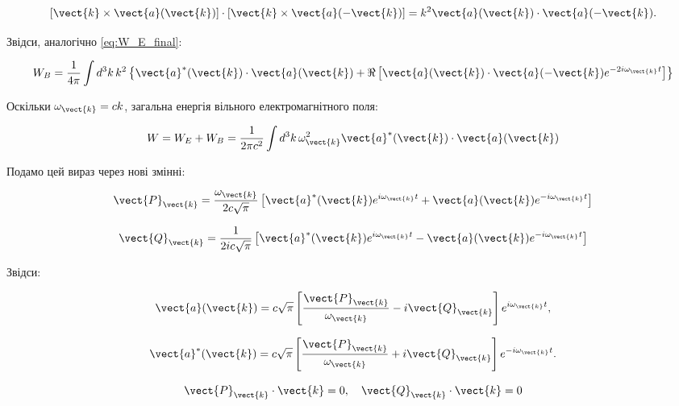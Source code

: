 \begin{equation*}
\left[ \vect{k} \times \vect{a}(\vect{k}) \right] \cdot \left[ \vect{k} \times \vect{a}(-\vect{k}) \right] = k^2 \vect{a}(\vect{k}) \cdot
\vect{a}(-\vect{k}).
\end{equation*}

Звідси, аналогічно \eqref{eq:W_E_final}:

\begin{equation}
W_B = \frac{1}{4\pi} \int d^3k \, k^2 \left\{ \vect{a}^*(\vect{k}) \cdot \vect{a}(\vect{k}) + \Re \left[ \vect{a}(\vect{k}) \cdot
\vect{a}(-\vect{k}) e^{-2i\omega_{\vect{k}} t} \right] \right\}
\label{eq:W_B_final}
\end{equation}

Оскільки \(\omega_{\vect{k}} = ck\), загальна енергія вільного електромагнітного поля:

\begin{equation}
W = W_E + W_B = \frac{1}{2\pi c^2} \int d^3k \, \omega_{\vect{k}}^2 \vect{a}^*(\vect{k}) \cdot \vect{a}(\vect{k})
\label{eq:total_energy}
\end{equation}

Подамо цей вираз через нові змінні:

\begin{equation}
\vect{P}_{\vect{k}} = \frac{\omega_{\vect{k}}}{2c\sqrt{\pi}} \left[ \vect{a}^*(\vect{k}) e^{i\omega_{\vect{k}} t} + \vect{a}(\vect{k})
e^{-i\omega_{\vect{k}} t} \right]
\label{eq:P_k}
\end{equation}

\begin{equation}
\vect{Q}_{\vect{k}} = \frac{1}{2ic\sqrt{\pi}} \left[ \vect{a}^*(\vect{k}) e^{i\omega_{\vect{k}} t} - \vect{a}(\vect{k}) e^{-i\omega_{\vect{k}} t} \right]
\label{eq:Q_k}
\end{equation}

Звідси:

\begin{equation*}
\vect{a}(\vect{k}) = c\sqrt{\pi} \left[ \frac{\vect{P}_{\vect{k}}}{\omega_{\vect{k}}} - i\vect{Q}_{\vect{k}} \right] e^{i\omega_{\vect{k}} t},
\end{equation*}

\begin{equation*}
\vect{a}^*(\vect{k}) = c\sqrt{\pi} \left[ \frac{\vect{P}_{\vect{k}}}{\omega_{\vect{k}}} + i\vect{Q}_{\vect{k}} \right] e^{-i\omega_{\vect{k}} t}.
\end{equation*}

\begin{equation*}
\vect{P}_{\vect{k}} \cdot \vect{k} = 0, \quad \vect{Q}_{\vect{k}} \cdot \vect{k} = 0
\end{equation*}